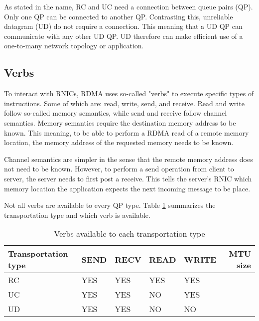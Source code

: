 As stated in the name, RC and UC need a connection between queue pairs (QP).
Only one QP can be connected to another QP.
Contrasting this, unreliable datagram (UD) do not require a connection.
This meaning that a UD QP can communicate with any other UD QP.
UD therefore can make efficient use of a one-to-many network topology or application.

\subsection{Verbs}
To interact with RNICs, RDMA uses so-called "verbs" to execute specific types of instructions.
Some of which are: read, write, send, and receive.
Read and write follow so-called memory semantics, while send and receive follow channel semantics.
Memory semantics require the destination memory address to be known.
This meaning, to be able to perform a RDMA read of a remote memory location, the memory address of the requested memory needs to be known.

Channel semantics are simpler in the sense that the remote memory address does not need to be known.
However, to perform a send operation from client to server, the server needs to first post a receive.
This tells the server's RNIC which memory location the application expects the next incoming message to be place.

Not all verbs are available to every QP type. Table \ref{tab:transport-verb} summarizes the transportation type and which verb is available.
\begin{table}
    \centering
    \begin{tabular}{lllllr}
        \toprule
        \textbf{Transportation type} & \textbf{SEND} & \textbf{RECV} & \textbf{READ} & \textbf{WRITE} & \textbf{MTU size} \\
        \midrule
        RC & YES & YES & YES & YES &  \\
        UC & YES & YES & NO & YES &  \\
        UD & YES & YES & NO & NO &  \\
        \bottomrule
    \end{tabular}
    \caption{Verbs available to each transportation type}
    \label{tab:transport-verb}
\end{table}



